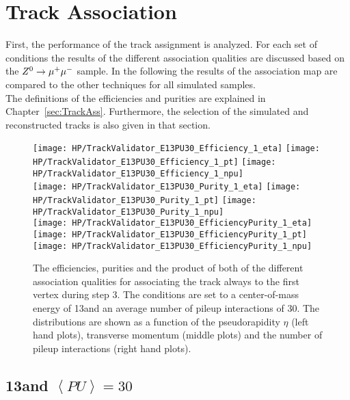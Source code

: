 \section{Track Association \label{sec:HPUTA}}

First, the performance of the track assignment is analyzed. For each set of conditions the results of the different association qualities are discussed based on the ${Z^{0}}\rightarrow\mu^+\mu^-$ sample. In the following the results of the association map are compared to the other techniques for all simulated samples.\\ 
The definitions of the efficiencies and purities are explained in Chapter~\ref{sec:TrackAss}. Furthermore, the selection of the simulated and reconstructed tracks is also given in that section.

\begin{figure}[!t]
  \centering
  \texttt{[image: HP/TrackValidator\_E13PU30\_Efficiency\_1\_eta]}
  \texttt{[image: HP/TrackValidator\_E13PU30\_Efficiency\_1\_pt]}
  \texttt{[image: HP/TrackValidator\_E13PU30\_Efficiency\_1\_npu]}
   \\
  \texttt{[image: HP/TrackValidator\_E13PU30\_Purity\_1\_eta]}
  \texttt{[image: HP/TrackValidator\_E13PU30\_Purity\_1\_pt]}
  \texttt{[image: HP/TrackValidator\_E13PU30\_Purity\_1\_npu]}
   \\
  \texttt{[image: HP/TrackValidator\_E13PU30\_EfficiencyPurity\_1\_eta]}
  \texttt{[image: HP/TrackValidator\_E13PU30\_EfficiencyPurity\_1\_pt]}
  \texttt{[image: HP/TrackValidator\_E13PU30\_EfficiencyPurity\_1\_npu]}
  \caption[Efficiencies, purities and their product of the different qualities of the association map with associating the track to the first vertex always during step 3 with 13\TeV and PU=30]{The efficiencies, purities and the product of both of the different association qualities for associating the track always to the first vertex during step 3. The conditions are set to a center-of-mass energy of 13\TeV and an average number of pileup interactions of 30. The distributions are shown as a function of the pseudorapidity $\eta$ (left hand plots), transverse momentum (middle plots) and the number of pileup interactions (right hand plots). \label{plot:HPUTAE13PU30ZtomumuQual1}}
\end{figure}


\subsection{13\TeV and $\left<PU\right>=30$ \label{sec:HPUTAE13PU30}}

